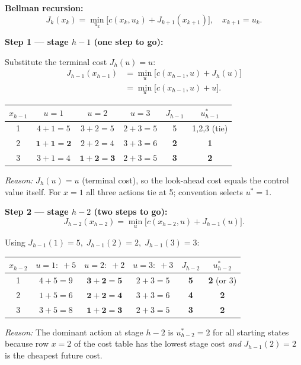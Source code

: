 \documentclass[10pt,a4paper]{article}
\newcommand{\reason}[1]{%
  \begin{mdframed}[backgroundcolor=reasonbg, linewidth=0.4pt,
    innertopmargin=3pt, innerbottommargin=3pt,
    innerleftmargin=6pt, innerrightmargin=6pt]
    \small\textit{Reason:} \small #1
  \end{mdframed}\vspace{2pt}}
\begin{document}
\medskip
\textbf{Bellman recursion:}
\[
  J_k(x_k) = \min_{u_k}\bigl[c(x_k,u_k) + J_{k+1}(x_{k+1})\bigr],
  \quad x_{k+1}=u_k.
\]

\bigskip
\textbf{Step 1 --- stage $h-1$ (one step to go):}

Substitute the terminal cost $J_h(u) = u$:
\begin{align*}
  J_{h-1}(x_{h-1}) &= \min_{u}\bigl[c(x_{h-1},u) + J_h(u)\bigr] \\
                   &= \min_{u}\bigl[c(x_{h-1},u) + u\bigr].
\end{align*}

\begin{center}
\begin{tabular}{c|ccc|cc}
$x_{h-1}$ & $u=1$ & $u=2$ & $u=3$ & $J_{h-1}$ & $u^*_{h-1}$ \\\hline
1 & $4+1=5$ & $3+2=5$ & $2+3=5$ & 5 & 1,2,3 (tie) \\
2 & $\mathbf{1+1=2}$ & $2+2=4$ & $3+3=6$ & \textbf{2} & \textbf{1} \\
3 & $3+1=4$ & $\mathbf{1+2=3}$ & $2+3=5$ & \textbf{3} & \textbf{2} \\
\end{tabular}
\end{center}

\reason{$J_h(u)=u$ (terminal cost), so the look-ahead cost equals the control value itself.
        For $x=1$ all three actions tie at 5; convention selects $u^*=1$.}

\bigskip
\textbf{Step 2 --- stage $h-2$ (two steps to go):}
\[
  J_{h-2}(x_{h-2}) = \min_{u}\bigl[c(x_{h-2},u) + J_{h-1}(u)\bigr].
\]

Using $J_{h-1}(1)=5,\; J_{h-1}(2)=2,\; J_{h-1}(3)=3$:

\begin{center}
\begin{tabular}{c|ccc|cc}
$x_{h-2}$ & $u=1:\;+5$ & $u=2:\;+2$ & $u=3:\;+3$ & $J_{h-2}$ & $u^*_{h-2}$ \\\hline
1 & $4+5=9$ & $\mathbf{3+2=5}$ & $2+3=5$ & \textbf{5} & \textbf{2} (or 3) \\
2 & $1+5=6$ & $\mathbf{2+2=4}$ & $3+3=6$ & \textbf{4} & \textbf{2} \\
3 & $3+5=8$ & $\mathbf{1+2=3}$ & $2+3=5$ & \textbf{3} & \textbf{2} \\
\end{tabular}
\end{center}

\reason{The dominant action at stage $h-2$ is $u^*_{h-2}=2$ for all starting states
        because row $x=2$ of the cost table has the lowest stage cost
        \emph{and} $J_{h-1}(2)=2$ is the cheapest future cost.}
\end{document}
